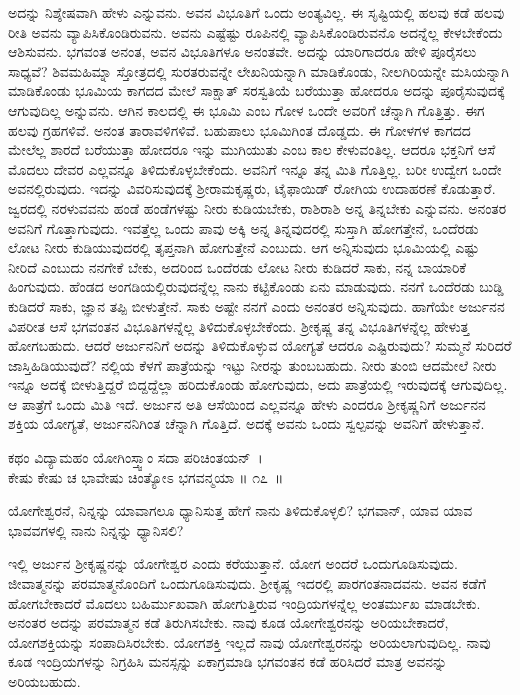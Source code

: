 ಅದನ್ನು ನಿಶ್ಶೇಷವಾಗಿ ಹೇಳು ಎನ್ನುವನು. ಅವನ ವಿಭೂತಿಗೆ ಒಂದು ಅಂತ್ಯವಿಲ್ಲ. ಈ ಸೃಷ್ಟಿಯಲ್ಲಿ ಹಲವು ಕಡೆ ಹಲವು ರೀತಿ ಅವನು ವ್ಯಾಪಿಸಿಕೊಂಡಿರುವನು. ಅವನು ಎಷ್ಟೆಷ್ಟು ರೂಪಿನಲ್ಲಿ ವ್ಯಾಪಿಸಿಕೊಂಡಿರುವನೊ ಅದನ್ನೆಲ್ಲ ಕೇಳಬೇಕೆಂದು ಆಶಿಸುವನು. ಭಗವಂತ ಅನಂತ, ಅವನ ವಿಭೂತಿಗಳೂ ಅನಂತವೇ. ಅದನ್ನು ಯಾರಿಗಾದರೂ ಹೇಳಿ ಪೂರೈಸಲು ಸಾಧ್ಯವೆ? ಶಿವಮಹಿಮ್ನಾ ಸ್ತೋತ್ರದಲ್ಲಿ ಸುರತರುವನ್ನೇ ಲೇಖನಿಯನ್ನಾಗಿ ಮಾಡಿಕೊಂಡು, ನೀಲಗಿರಿಯನ್ನೇ ಮಸಿಯನ್ನಾಗಿ ಮಾಡಿಕೊಂಡು ಭೂಮಿಯ ಕಾಗದದ ಮೇಲೆ ಸಾಕ್ಷಾತ್ ಸರಸ್ವತಿಯೆ ಬರೆಯುತ್ತಾ ಹೋದರೂ ಅದನ್ನು ಪೂರೈಸುವುದಕ್ಕೆ ಆಗುವುದಿಲ್ಲ ಅನ್ನುವನು. ಆಗಿನ ಕಾಲದಲ್ಲಿ ಈ ಭೂಮಿ ಎಂಬ ಗೋಳ ಒಂದೇ ಅವರಿಗೆ ಚೆನ್ನಾಗಿ ಗೊತ್ತಿತ್ತು. ಈಗ ಹಲವು ಗ್ರಹಗಳಿವೆ. ಅನಂತ ತಾರಾವಳಿಗಳಿವೆ. ಬಹುಪಾಲು ಭೂಮಿಗಿಂತ ದೊಡ್ಡದು. ಈ ಗೋಳಗಳ ಕಾಗದದ ಮೇಲೆಲ್ಲ ಶಾರದೆ ಬರೆಯುತ್ತಾ ಹೋದರೂ ಇನ್ನು ಮುಗಿಯುತು ಎಂಬ ಕಾಲ ಕೇಳುವಂತಿಲ್ಲ. ಆದರೂ ಭಕ್ತನಿಗೆ ಆಸೆ ಮೊದಲು ದೇವರ ಎಲ್ಲವನ್ನೂ ತಿಳಿದುಕೊಳ್ಳಬೇಕೆಂದು. ಅವನಿಗೆ ಇನ್ನೂ ತನ್ನ ಮಿತಿ ಗೊತ್ತಿಲ್ಲ. ಬರೀ ಉದ್ವೇಗ ಒಂದೇ ಅವನಲ್ಲಿರುವುದು. ಇದನ್ನು ವಿವರಿಸುವುದಕ್ಕೆ ಶ‍್ರೀರಾಮಕೃಷ್ಣರು, ಟೈಫಾಯಿಡ್ ರೋಗಿಯ ಉದಾಹರಣೆ ಕೊಡುತ್ತಾರೆ. ಜ್ವರದಲ್ಲಿ ನರಳುವವನು ಹಂಡೆ ಹಂಡೆಗಳಷ್ಟು ನೀರು ಕುಡಿಯಬೇಕು, ರಾಶಿರಾಶಿ ಅನ್ನ ತಿನ್ನಬೇಕು ಎನ್ನುವನು. ಅನಂತರ ಅವನಿಗೆ ಗೊತ್ತಾಗುವುದು. ಇವತ್ತೆಲ್ಲ ಒಂದು ಪಾವು ಅಕ್ಕಿ ಅನ್ನ ತಿನ್ನವುದರಲ್ಲಿ ಸುಸ್ತಾಗಿ ಹೋಗತ್ತೇನೆ, ಒಂದೆರಡು ಲೋಟ ನೀರು ಕುಡಿಯುವುದರಲ್ಲಿ ತೃಪ್ತನಾಗಿ ಹೋಗುತ್ತೇನೆ ಎಂಬುದು. ಆಗ ಅನ್ನಿಸುವುದು ಭೂಮಿಯಲ್ಲಿ ಎಷ್ಟು ನೀರಿದೆ ಎಂಬುದು ನನಗೇಕೆ ಬೇಕು, ಅದರಿಂದ ಒಂದೆರಡು ಲೋಟ ನೀರು ಕುಡಿದರೆ ಸಾಕು, ನನ್ನ ಬಾಯಾರಿಕೆ ಹಿಂಗುವುದು. ಹೆಂಡದ ಅಂಗಡಿಯಲ್ಲಿರುವುದನ್ನೆಲ್ಲ ನಾನು ಕಟ್ಟಿಕೊಂಡು ಏನು ಮಾಡುವುದು. ನನಗೆ ಒಂದೆರಡು ಬುಡ್ಡಿ ಕುಡಿದರೆ ಸಾಕು, ಜ್ಞಾನ ತಪ್ಪಿ ಬೀಳುತ್ತೇನೆ. ಸಾಕು ಅಷ್ಟೇ ನನಗೆ ಎಂದು ಅನಂತರ ಅನ್ನಿಸುವುದು. ಹಾಗೆಯೇ ಅರ್ಜುನನ ವಿಪರೀತ ಆಸೆ ಭಗವಂತನ ವಿಭೂತಿಗಳನ್ನೆಲ್ಲ ತಿಳಿದುಕೊಳ್ಳಬೇಕೆಂದು. ಶ‍್ರೀಕೃಷ್ಣ ತನ್ನ ವಿಭೂತಿಗಳನ್ನೆಲ್ಲ ಹೇಳುತ್ತ ಹೋಗಬಹುದು. ಆದರೆ ಅರ್ಜುನನಿಗೆ ಅದನ್ನು ತಿಳಿದುಕೊಳ್ಳುವ ಯೋಗ್ಯತೆ ಆದರೂ ಎಷ್ಟಿರುವುದು? ಸುಮ್ಮನೆ ಸುರಿದರೆ ಜಾಸ್ತಿಹಿಡಿಯುವುದೆ? ನಲ್ಲಿಯ ಕೆಳಗೆ ಪಾತ್ರೆಯನ್ನು ಇಟ್ಟು ನೀರನ್ನು ತುಂಬಬಹುದು. ನೀರು ತುಂಬಿ ಆದಮೇಲೆ ನೀರು ಇನ್ನೂ ಅದಕ್ಕೆ ಬೀಳುತ್ತಿದ್ದರೆ ಬಿದ್ದದ್ದೆಲ್ಲಾ ಹರಿದುಕೊಂಡು ಹೋಗುವುದು, ಅದು ಪಾತ್ರೆಯಲ್ಲಿ ಇರುವುದಕ್ಕೆ ಆಗುವುದಿಲ್ಲ. ಆ ಪಾತ್ರೆಗೆ ಒಂದು ಮಿತಿ ಇದೆ. ಅರ್ಜುನ ಅತಿ ಆಸೆಯಿಂದ ಎಲ್ಲವನ್ನೂ ಹೇಳು ಎಂದರೂ ಶ‍್ರೀಕೃಷ್ಣನಿಗೆ ಅರ್ಜುನನ ಶಕ್ತಿಯ ಯೋಗ್ಯತೆ, ಅರ್ಜುನನಿಗಿಂತ ಚೆನ್ನಾಗಿ ಗೊತ್ತಿದೆ. ಅದಕ್ಕೆ ಅವನು ಒಂದು ಸ್ವಲ್ಪವನ್ನು ಅವನಿಗೆ ಹೇಳುತ್ತಾನೆ.

\begin{shloka}
ಕಥಂ ವಿದ್ಯಾಮಹಂ ಯೋಗಿಂಸ್ತ್ವಾಂ ಸದಾ ಪರಿಚಿಂತಯನ್~।\\ಕೇಷು ಕೇಷು ಚ ಭಾವೇಷು ಚಿಂತ್ಯೋಽ ಭಗವನ್ಮಯಾ \hfill॥ ೧೭~॥
\end{shloka}

\begin{artha}
ಯೋಗೇಶ್ವರನೆ, ನಿನ್ನನ್ನು ಯಾವಾಗಲೂ ಧ್ಯಾನಿಸುತ್ತ ಹೇಗೆ ನಾನು ತಿಳಿದುಕೊಳ್ಳಲಿ? ಭಗವಾನ್, ಯಾವ ಯಾವ ಭಾವವಗಳಲ್ಲಿ ನಾನು ನಿನ್ನನ್ನು ಧ್ಯಾನಿಸಲಿ?
\end{artha}

ಇಲ್ಲಿ ಅರ್ಜುನ ಶ‍್ರೀಕೃಷ್ಣನನ್ನು ಯೋಗೇಶ್ವರ ಎಂದು ಕರೆಯುತ್ತಾನೆ. ಯೋಗ ಅಂದರೆ ಒಂದುಗೂಡಿಸುವುದು. ಜೀವಾತ್ಮನನ್ನು ಪರಮಾತ್ಮನೊಂದಿಗೆ ಒಂದುಗೂಡಿಸುವುದು. ಶ‍್ರೀಕೃಷ್ಣ ಇದರಲ್ಲಿ ಪಾರಗಂತನಾದವನು. ಅವನ ಕಡೆಗೆ ಹೋಗಬೇಕಾದರೆ ಮೊದಲು ಬಹಿರ್ಮುಖವಾಗಿ ಹೋಗುತ್ತಿರುವ ಇಂದ್ರಿಯಗಳನ್ನೆಲ್ಲ ಅಂತರ್ಮುಖ ಮಾಡಬೇಕು. ಅನಂತರ ಅದನ್ನು ಪರಮಾತ್ಮನ ಕಡೆ ತಿರುಗಿಸಬೇಕು. ನಾವು ಕೂಡ ಯೋಗೇಶ್ವರನನ್ನು ಅರಿಯಬೇಕಾದರೆ, ಯೋಗಶಕ್ತಿಯನ್ನು ಸಂಪಾದಿಸಿರಬೇಕು. ಯೋಗಶಕ್ತಿ ಇಲ್ಲದೆ ನಾವು ಯೋಗೇಶ್ವರನನ್ನು ಅರಿಯಲಾಗುವುದಿಲ್ಲ. ನಾವು ಕೂಡ ಇಂದ್ರಿಯಗಳನ್ನು ನಿಗ್ರಹಿಸಿ ಮನಸ್ಸನ್ನು ಏಕಾಗ್ರಮಾಡಿ ಭಗವಂತನ ಕಡೆ ಹರಿಸಿದರೆ ಮಾತ್ರ ಅವನನ್ನು ಅರಿಯಬಹುದು.

